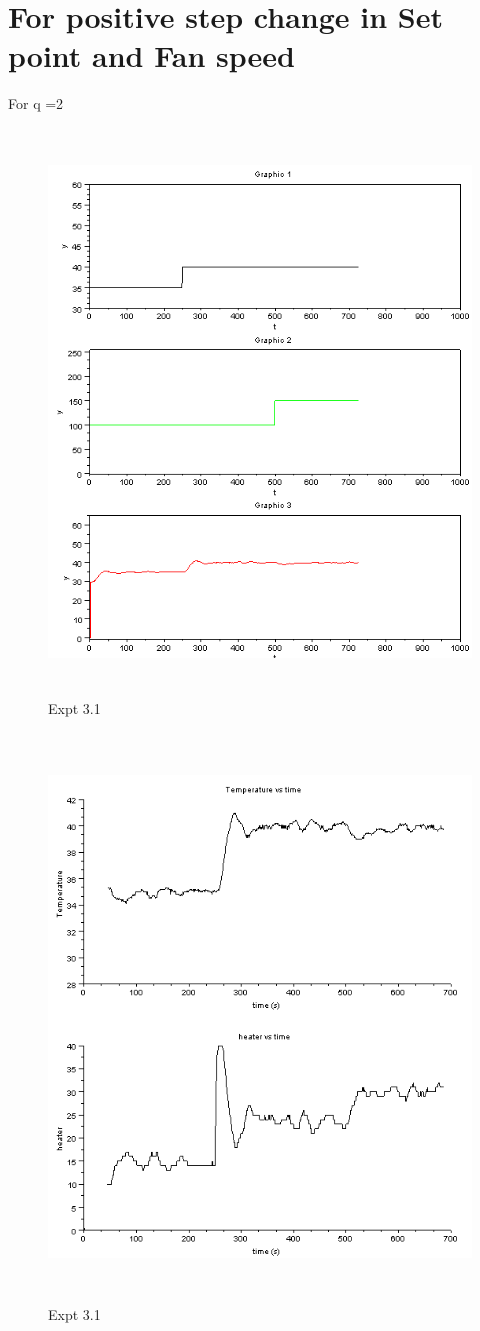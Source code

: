 \section{For positive step change in Set point and Fan speed }
For q =2
\begin{figure}[H]
  \includegraphics[width=12cm, height=15cm]{mpc/3_1.PNG}
  \caption{Expt 3.1}
\end{figure}
\begin{figure}[H]
  \includegraphics[width=12cm, height=15cm]{mpc/3_1_heater_final.png}
  \caption{Expt 3.1}
\end{figure}



